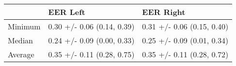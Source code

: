 \begin{tabular}{lll}
\toprule
{} &                    EER Left &                   EER Right \\
\midrule
Minimum &  0.30 +/- 0.06 (0.14, 0.39) &  0.31 +/- 0.06 (0.15, 0.40) \\
Median  &  0.24 +/- 0.09 (0.00, 0.33) &  0.25 +/- 0.09 (0.01, 0.34) \\
Average &  0.35 +/- 0.11 (0.28, 0.75) &  0.35 +/- 0.11 (0.28, 0.72) \\
\bottomrule
\end{tabular}
